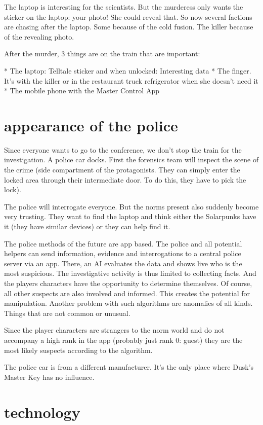 \documentclass{book}
\begin{document}
The laptop is interesting for the scientists. But the murderess only wants the sticker on the laptop: your photo! She could reveal that. So now several factions are chasing after the laptop. Some because of the cold fusion. The killer because of the revealing photo.

After the murder, 3 things are on the train that are important:

* The laptop: Telltale sticker and when unlocked: Interesting data
* The finger. It's with the killer or in the restaurant truck refrigerator when she doesn't need it
* The mobile phone with the Master Control App

\section{appearance of the police}

Since everyone wants to go to the conference, we don't stop the train for the investigation. A police car docks. First the forensics team will inspect the scene of the crime (side compartment of the protagonists. They can simply enter the locked area through their intermediate door. To do this, they have to pick the lock).

The police will interrogate everyone. But the norms present also suddenly become very trusting. They want to find the laptop and think either the Solarpunks have it (they have similar devices) or they can help find it.

The police methods of the future are app based. The police and all potential helpers can send information, evidence and interrogations to a central police server via an app. There, an AI evaluates the data and shows live who is the most suspicious. The investigative activity is thus limited to collecting facts. And the players characters have the opportunity to determine themselves. Of course, all other suspects are also involved and informed. This creates the potential for manipulation.
Another problem with such algorithms are anomalies of all kinds. Things that are not common or unusual.

Since the player characters are strangers to the norm world and do not accompany a high rank in the app (probably just rank 0: guest) they are the most likely suspects according to the algorithm.

The police car is from a different manufacturer. It's the only place where Dusk's Master Key has no influence.

\section{technology}
\end{document}
